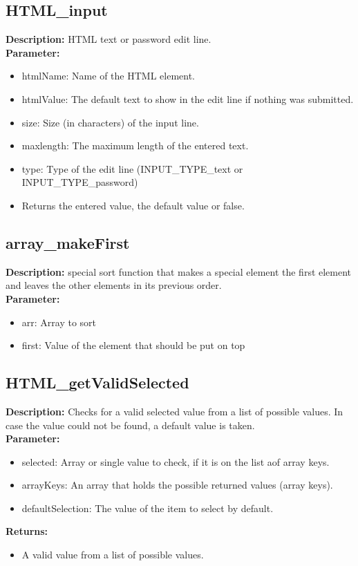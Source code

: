 \subsection{HTML\_input}
\textbf{Description:} HTML text or password edit line.\\
\textbf{Parameter:}
\begin{itemize}
\item htmlName: Name of the HTML element.
\item htmlValue: The default text to show in the edit line if nothing was submitted.
\item size: Size (in characters) of the input line.
\item maxlength: The maximum length of the entered text.
\item type: Type of the edit line (INPUT\_TYPE\_text or INPUT\_TYPE\_password)
\item Returns the entered value, the default value or false.
\end{itemize}

\subsection{array\_makeFirst}
\textbf{Description:} special sort function that makes a special element the first element and leaves the other elements in its previous order.\\
\textbf{Parameter:}
\begin{itemize}
\item arr: Array to sort
\item first: Value of the element that should be put on top
\end{itemize}

\subsection{HTML\_getValidSelected}
\textbf{Description:} Checks for a valid selected value from a list of possible values. In case the value could not be found, a default value is taken.\\
\textbf{Parameter:}
\begin{itemize}
\item selected: Array or single value to check, if it is on the list aof array keys.
\item arrayKeys: An array that holds the possible returned values (array keys).
\item defaultSelection: The value of the item to select by default.
\end{itemize}
\textbf{Returns:}
\begin{itemize}
\item A valid value from a list of possible values.
\end{itemize}

